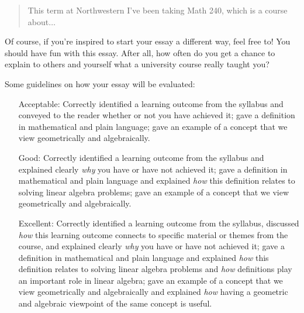 \documentclass[letter]{article}
\begin{document}
\begin{enumerate}
\begin{quote}
				This term at Northwestern I've been taking Math 240, which is a course about$\ldots$
			\end{quote}

			Of course, if you're inspired to start your essay a different way, feel free to!
			You should have fun with this essay.  After all, how often do you get a chance to explain 
			to others and yourself what a university course really taught you?

			Some guidelines on how your essay will be evaluated:
			\begin{enumerate}
				\item[Acceptable:]
					Correctly identified a learning outcome from the syllabus 
					and conveyed to the reader whether or not you have achieved it; gave a definition in mathematical
					and plain language; gave an example of a concept that we view geometrically and algebraically.
				\item[Good:]
					Correctly identified a learning outcome from the syllabus
					and explained clearly \emph{why} you have or have not achieved it; gave a definition in mathematical
					and plain language and explained \emph{how}
					this definition relates to solving linear algebra problems; 
					gave an example of a concept that we view geometrically and algebraically.
				\item[Excellent:]
					Correctly identified a learning outcome from the syllabus, 
					discussed \emph{how} this learning outcome connects to specific material or themes from the course, 
					and explained clearly \emph{why} you have or have not achieved it;  gave a definition in mathematical
					and plain language and explained \emph{how}
					this definition relates to solving linear algebra problems and \emph{how} definitions play an
					important role in linear algebra; gave an example of a concept that we view geometrically and algebraically
					and explained \emph{how} having a geometric and algebraic viewpoint of the same concept
					is useful.
			\end{enumerate}

		
	\end{enumerate}
\end{document}
